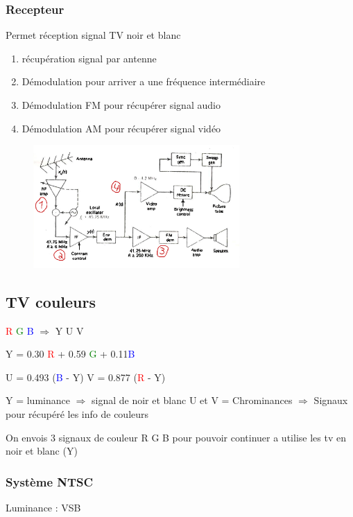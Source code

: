 			\subsubsection{Recepteur}
				Permet réception signal TV noir et blanc
				\begin{enumerate}
					\item récupération signal par antenne
					\item Démodulation pour arriver a une fréquence intermédiaire
					\item Démodulation FM pour récupérer signal audio
					\item Démodulation AM pour récupérer signal vidéo
					
				\end{enumerate}
				
				\begin{figure}[htp]
				\centering
				\includegraphics[width=0.7\textwidth]{img/recepteurTVNoirBlanc.png}
				\end{figure}
		\newpage
		\subsection{TV couleurs}
			\textcolor{red}{R} \textcolor{green}{G} \textcolor{blue}{B} $\Rightarrow$ Y U V
			
			Y = 0.30 \textcolor{red}{R} + 0.59 \textcolor{green}{G} + 0.11\textcolor{blue}{B}
			
			U = 0.493 (\textcolor{blue}{B} - Y)
			V = 0.877 (\textcolor{red}{R} - Y)
			
			Y = luminance $\Rightarrow$ signal de noir et blanc
			U et V = Chrominances $\Rightarrow$ Signaux pour récupéré les info de couleurs
			
			On envois 3 signaux de couleur R G B pour pouvoir continuer a utilise les tv en noir et blanc (Y)
			
			\subsubsection{Système NTSC}
				Luminance : VSB
				
